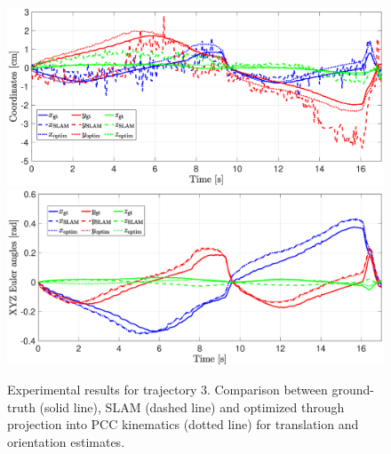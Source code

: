 \begin{figure}[ht]
    \centering
    \includegraphics[width=\columnwidth, trim={2cm 1.2cm 2cm 0}]{srslam/figures/vtem28_t3_coordinates.eps}\\
    \includegraphics[width=\columnwidth, trim={2cm 0 2cm 1.2cm}]{srslam/figures/vtem28_t3_angles.eps}
    \caption{ Experimental results for trajectory 3. Comparison between ground-truth (solid line), \gls{SLAM} (dashed line) and optimized through projection into \gls{PCC} kinematics (dotted line) for translation and orientation estimates.}
    \label{fig:srslam:experiments_t3_over_time}
\end{figure}

